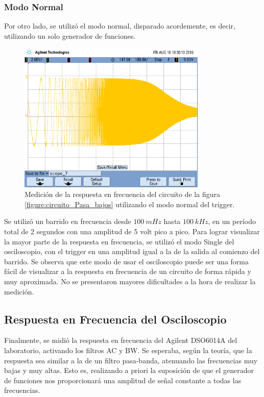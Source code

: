 \documentclass[11pt, a4paper]{article}
\begin{document}
\subsubsection*{Modo Normal}
Por otro lado, se utilizó el modo normal, disparado acordemente, es decir, utilizando un solo generador de funciones.
\begin{figure}[H]
	\centering
	\includegraphics[width=0.8\textwidth,trim={0.6cm 7cm  1 5cm},clip]{ej3normal.png}
	\caption{Medición de la respuesta en frecuencia del circuito de la figura \ref{figure:circuito_Pasa_bajos} utilizando el modo normal del trigger.} 
	\label{graf:ej3modonormal}
\end{figure}
Se utilizó un barrido en frecuencia desde $100 \ mHz$ hasta $100 \ kHz$, en un período total de 2 segundos con una amplitud de 5 volt pico a pico. Para lograr visualizar la mayor parte de la respuesta en frecuencia, se utilizó el modo Single del osciloscopio, con el trigger en una amplitud igual a la de la salida al comienzo del barrido. Se observa que este modo de usar el osciloscopio puede ser una forma fácil de visualizar a la respuesta en frecuencia de un circuito de forma rápida y muy aproximada. No se presentaron mayores dificultades a la hora de realizar la medición.

\break

\subsection*{Respuesta en Frecuencia del Osciloscopio}
Finalmente, se midió la respuesta en frecuencia del Agilent DSO6014A del laboratorio, activando los filtros AC y BW. Se esperaba, según la teoría, que la respuesta sea similar a la de un filtro pasa-banda, atenuando las frecuencias muy bajas y muy altas. Esto es, realizando a priori la suposición de que el generador de funciones nos proporcionará una amplitud de señal constante a todas las frecuencias.
\end{document}
